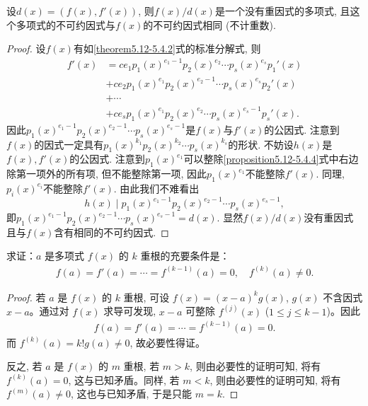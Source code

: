 \documentclass[lang=cn,newtx,10pt,scheme=chinese]{elegantbook}
\begin{document}
\begin{theorem}\label{theorem:多项式除去与其导数的最大公因式就能消去重因式}
设\(d(x)=(f(x),f'(x))\), 则\(f(x)/d(x)\)是一个没有重因式的多项式, 且这个多项式的不可约因式与\(f(x)\)的不可约因式相同 (不计重数).
\end{theorem}
\begin{proof}
设\(f(x)\)有如\eqref{theorem5.12-5.4.2}式的标准分解式, 则
\begin{align*}
f'(x)&=ce_1p_1(x)^{e_1 - 1}p_2(x)^{e_2}\cdots p_s(x)^{e_s}p_1'(x)\\
&+ce_2p_1(x)^{e_1}p_2(x)^{e_2 - 1}\cdots p_s(x)^{e_s}p_2'(x)\\
&+\cdots\\
&+ce_sp_1(x)^{e_1}p_2(x)^{e_2}\cdots p_s(x)^{e_s - 1}p_s'(x).\label{proposition5.12-5.4.4}
\end{align*}
因此\(p_1(x)^{e_1 - 1}p_2(x)^{e_2 - 1}\cdots p_s(x)^{e_s - 1}\)是\(f(x)\)与\(f'(x)\)的公因式. 注意到\(f(x)\)的因式一定具有\(p_1(x)^{k_1}p_2(x)^{k_2}\cdots p_s(x)^{k_s}\)的形状. 不妨设\(h(x)\)是\(f(x),f'(x)\)的公因式. 注意到\(p_1(x)^{e_1}\)可以整除\eqref{proposition5.12-5.4.4}式中右边除第一项外的所有项, 但不能整除第一项, 因此\(p_1(x)^{e_1}\)不能整除\(f'(x)\). 同理, \(p_i(x)^{e_i}\)不能整除\(f'(x)\). 由此我们不难看出
\[
h(x)\mid p_1(x)^{e_1 - 1}p_2(x)^{e_2 - 1}\cdots p_s(x)^{e_s - 1},
\]
即\(p_1(x)^{e_1 - 1}p_2(x)^{e_2 - 1}\cdots p_s(x)^{e_s - 1}=d(x)\). 显然\(f(x)/d(x)\)没有重因式且与\(f(x)\)含有相同的不可约因式.
\end{proof}

\begin{proposition}[多项式有k重根的充要条件]\label{proposition:多项式有k重根的充要条件}
求证：$a$ 是多项式 $f(x)$ 的 $k$ 重根的充要条件是：
\begin{align*}
f(a) = f'(a) = \cdots = f^{(k-1)}(a) = 0, \quad f^{(k)}(a) \neq 0.
\end{align*}
\end{proposition}
\begin{proof}
若 $a$ 是 $f(x)$ 的 $k$ 重根, 可设 $f(x) = (x - a)^k g(x)$, $g(x)$ 不含因式 $x - a$。通过对 $f(x)$ 求导可发现, $x - a$ 可整除 $f^{(j)}(x)$ ($1 \leq j \leq k - 1$)。因此
\begin{align*}
f(a) = f'(a) = \cdots = f^{(k-1)}(a) = 0.
\end{align*}
而 $f^{(k)}(a) = k! g(a) \neq 0$, 故必要性得证。

反之, 若 $a$ 是 $f(x)$ 的 $m$ 重根, 若 $m > k$, 则由必要性的证明可知, 将有 $f^{(k)}(a) = 0$, 这与已知矛盾。同样, 若 $m < k$, 则由必要性的证明可知, 将有 $f^{(m)}(a) \neq 0$, 这也与已知矛盾, 于是只能 $m = k$.
\end{proof}
\end{document}
